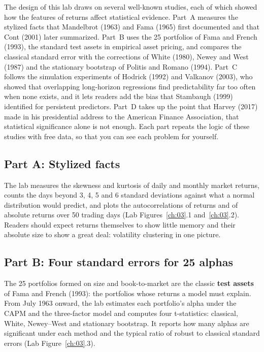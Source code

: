The design of this lab draws on several well-known studies, each of which showed how the features of returns affect statistical evidence. Part~A measures the stylized facts that Mandelbrot (1963) and Fama (1965) first documented and that Cont (2001) later summarized. Part~B uses the 25 portfolios of Fama and French (1993), the standard test assets in empirical asset pricing, and compares the classical standard error with the corrections of White (1980), Newey and West (1987) and the stationary bootstrap of Politis and Romano (1994). Part~C follows the simulation experiments of Hodrick (1992) and Valkanov (2003), who showed that overlapping long-horizon regressions find predictability far too often when none exists, and it lets readers add the bias that Stambaugh (1999) identified for persistent predictors. Part~D takes up the point that Harvey (2017) made in his presidential address to the American Finance Association, that statistical significance alone is not enough. Each part repeats the logic of these studies with free data, so that you can see each problem for yourself.


\subsection*{Part A: Stylized facts}

The lab measures the skewness and kurtosis of daily and monthly market returns, counts the days beyond 3, 4, 5 and 6 standard deviations against what a normal distribution would predict, and plots the autocorrelations of returns and of absolute returns over 50 trading days (Lab Figures~\ref{ch:03}.1 and~\ref{ch:03}.2). Readers should expect returns themselves to show little memory and their absolute size to show a great deal: volatility clustering in one picture.

\subsection*{Part B: Four standard errors for 25 alphas}

The 25 portfolios formed on size and book-to-market are the classic \textbf{test assets} of Fama and French (1993): the portfolios whose returns a model must explain. From July 1963 onward, the lab estimates each portfolio's alpha under the CAPM and the three-factor model and computes four t-statistics: classical, White, Newey--West and stationary bootstrap. It reports how many alphas are significant under each method and the typical ratio of robust to classical standard errors (Lab Figure~\ref{ch:03}.3).


